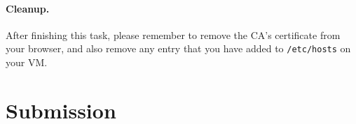 \paragraph{Cleanup.} After finishing this task, 
please remember to remove the CA's certificate from your browser, and 
also remove any entry that you have added to \texttt{/etc/hosts} 
on your VM.



\section{Submission}











